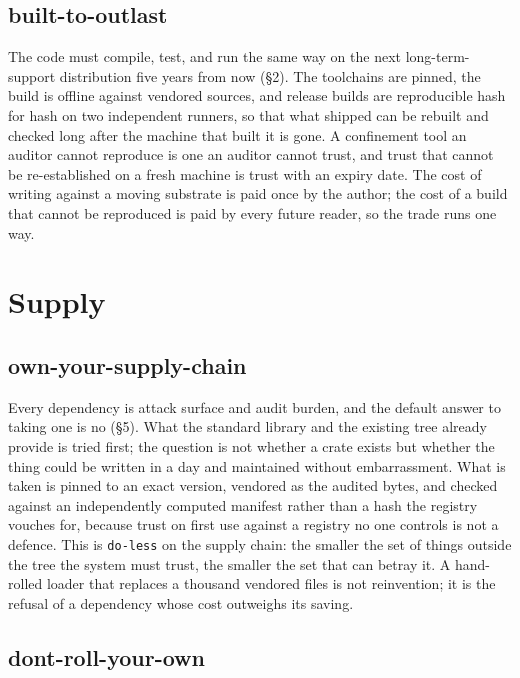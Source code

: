 \hypertarget{built-to-outlast}{%
\subsection{built-to-outlast}\label{built-to-outlast}}

The code must compile, test, and run the same way on the next
long-term-support distribution five years from now (§2). The toolchains
are pinned, the build is offline against vendored sources, and release
builds are reproducible hash for hash on two independent runners, so
that what shipped can be rebuilt and checked long after the machine that
built it is gone. A confinement tool an auditor cannot reproduce is one
an auditor cannot trust, and trust that cannot be re-established on a
fresh machine is trust with an expiry date. The cost of writing against
a moving substrate is paid once by the author; the cost of a build that
cannot be reproduced is paid by every future reader, so the trade runs
one way.

\hypertarget{supply}{%
\section{Supply}\label{supply}}

\hypertarget{own-your-supply-chain}{%
\subsection{own-your-supply-chain}\label{own-your-supply-chain}}

Every dependency is attack surface and audit burden, and the default
answer to taking one is no (§5). What the standard library and the
existing tree already provide is tried first; the question is not
whether a crate exists but whether the thing could be written in a day
and maintained without embarrassment. What is taken is pinned to an
exact version, vendored as the audited bytes, and checked against an
independently computed manifest rather than a hash the registry vouches
for, because trust on first use against a registry no one controls is
not a defence. This is \texttt{do-less} on the supply chain: the smaller
the set of things outside the tree the system must trust, the smaller
the set that can betray it. A hand-rolled loader that replaces a
thousand vendored files is not reinvention; it is the refusal of a
dependency whose cost outweighs its saving.

\hypertarget{dont-roll-your-own}{%
\subsection{dont-roll-your-own}\label{dont-roll-your-own}}

